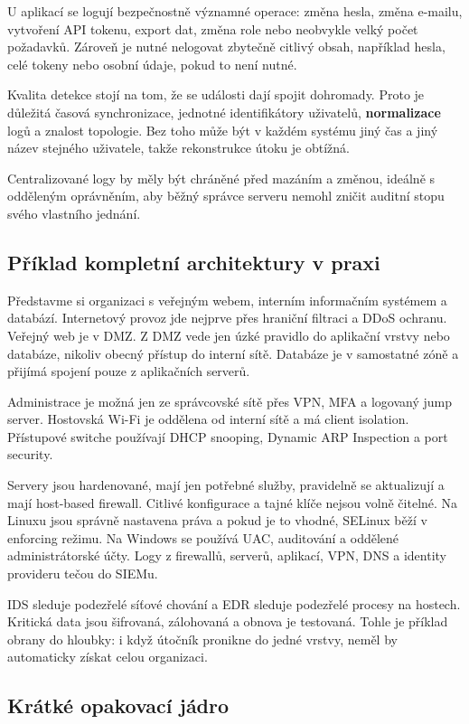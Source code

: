 U aplikací se logují bezpečnostně významné operace: změna hesla, změna e-mailu, vytvoření API tokenu, export dat, změna role nebo neobvykle velký počet požadavků. Zároveň je nutné nelogovat zbytečně citlivý obsah, například hesla, celé tokeny nebo osobní údaje, pokud to není nutné.

Kvalita detekce stojí na tom, že se události dají spojit dohromady. Proto je důležitá časová synchronizace, jednotné identifikátory uživatelů, \textbf{normalizace} logů a znalost topologie. Bez toho může být v každém systému jiný čas a jiný název stejného uživatele, takže rekonstrukce útoku je obtížná.

Centralizované logy by měly být chráněné před mazáním a změnou, ideálně s odděleným oprávněním, aby běžný správce serveru nemohl zničit auditní stopu svého vlastního jednání.

\subsection*{Příklad kompletní architektury v praxi}

Představme si organizaci s veřejným webem, interním informačním systémem a databází. Internetový provoz jde nejprve přes hraniční filtraci a DDoS ochranu. Veřejný web je v DMZ. Z DMZ vede jen úzké pravidlo do aplikační vrstvy nebo databáze, nikoliv obecný přístup do interní sítě. Databáze je v samostatné zóně a přijímá spojení pouze z aplikačních serverů.

Administrace je možná jen ze správcovské sítě přes VPN, MFA a logovaný jump server. Hostovská Wi-Fi je oddělena od interní sítě a má client isolation. Přístupové switche používají DHCP snooping, Dynamic ARP Inspection a port security.

Servery jsou hardenované, mají jen potřebné služby, pravidelně se aktualizují a mají host-based firewall. Citlivé konfigurace a tajné klíče nejsou volně čitelné. Na Linuxu jsou správně nastavena práva a pokud je to vhodné, SELinux běží v enforcing režimu. Na Windows se používá UAC, auditování a oddělené administrátorské účty. Logy z firewallů, serverů, aplikací, VPN, DNS a identity provideru tečou do SIEMu.

IDS sleduje podezřelé síťové chování a EDR sleduje podezřelé procesy na hostech. Kritická data jsou šifrovaná, zálohovaná a obnova je testovaná. Tohle je příklad obrany do hloubky: i když útočník pronikne do jedné vrstvy, neměl by automaticky získat celou organizaci.

\subsection*{Krátké opakovací jádro}

